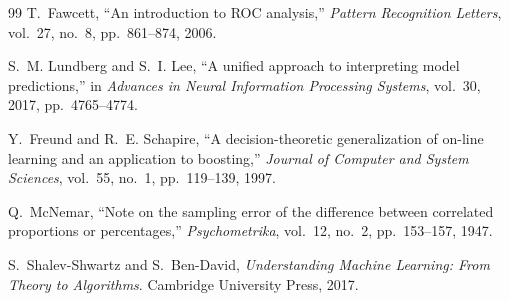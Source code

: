 \documentclass[conference,10pt]{IEEEtran}
\begin{document}
\begin{thebibliography}{99}
T.~Fawcett,
``An introduction to ROC analysis,''
\textit{Pattern Recognition Letters}, vol.~27, no.~8, pp.~861--874, 2006.

S.~M. Lundberg and S.~I. Lee,
``A unified approach to interpreting model predictions,''
in \textit{Advances in Neural Information Processing Systems}, vol.~30, 2017, pp.~4765--4774.

Y.~Freund and R.~E. Schapire,
``A decision-theoretic generalization of on-line learning and an application to boosting,''
\textit{Journal of Computer and System Sciences}, vol.~55, no.~1, pp.~119--139, 1997.

Q.~McNemar,
``Note on the sampling error of the difference between correlated proportions or percentages,''
\textit{Psychometrika}, vol.~12, no.~2, pp.~153--157, 1947.

S.~Shalev-Shwartz and S.~Ben-David,
\textit{Understanding Machine Learning: From Theory to Algorithms}.
Cambridge University Press, 2017.

\end{thebibliography}
\end{document}
